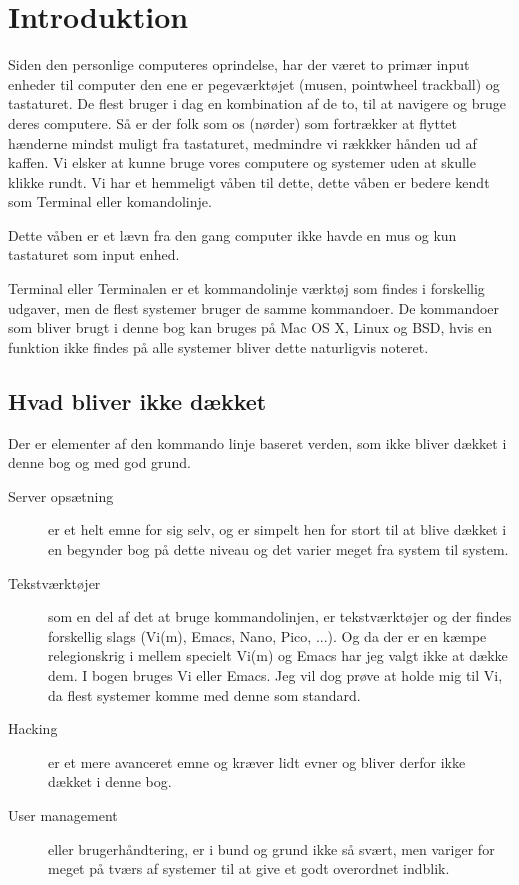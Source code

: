 \chapter{Introduktion}
Siden den personlige computeres oprindelse, har der været to primær input enheder til computer den ene er pegeværktøjet (musen, pointwheel trackball) og tastaturet. De flest bruger i dag en kombination af de to, til at navigere og bruge deres computere. Så er der folk som os (nørder) som fortrækker at flyttet hænderne mindst muligt fra tastaturet, medmindre vi rækkker hånden ud af kaffen. Vi elsker at kunne bruge vores computere og systemer uden at skulle klikke rundt. Vi har et hemmeligt våben til dette, dette våben er bedere kendt som Terminal eller komandolinje.
\par Dette våben er et lævn fra den gang computer ikke havde en mus og kun tastaturet som input enhed.

Terminal eller Terminalen er et kommandolinje værktøj som findes i forskellig udgaver, men de flest systemer bruger de samme kommandoer. De kommandoer som bliver brugt i denne bog kan bruges på Mac OS X, Linux og BSD, hvis en funktion ikke findes på alle systemer bliver dette naturligvis noteret.

\section{Hvad bliver ikke dækket}
Der er elementer af den kommando linje baseret verden, som ikke bliver dækket i denne bog og med god grund.
\begin{description}
  \item[Server opsætning] er et helt emne for sig selv, og er simpelt hen for stort til at blive dækket i en begynder bog på dette niveau og det varier meget fra system til system.
  \item[Tekstværktøjer] som en del af det at bruge kommandolinjen, 
    er tekstværktøjer og der findes forskellig slags (Vi(m), Emacs, Nano, 
    Pico, ...). Og da der er en kæmpe relegionskrig i mellem specielt Vi(m) 
    og Emacs har jeg valgt ikke at dække dem. I bogen bruges Vi eller Emacs. Jeg vil 
    dog prøve at holde mig til Vi, da flest systemer komme med denne som standard.
  \item[Hacking] er et mere avanceret emne og kræver lidt evner og bliver derfor ikke dækket i denne bog.
  \item[User management] eller brugerhåndtering, er i bund og grund ikke så svært, men variger for meget på tværs af systemer til at give 
    et godt overordnet indblik.
\end{description}

